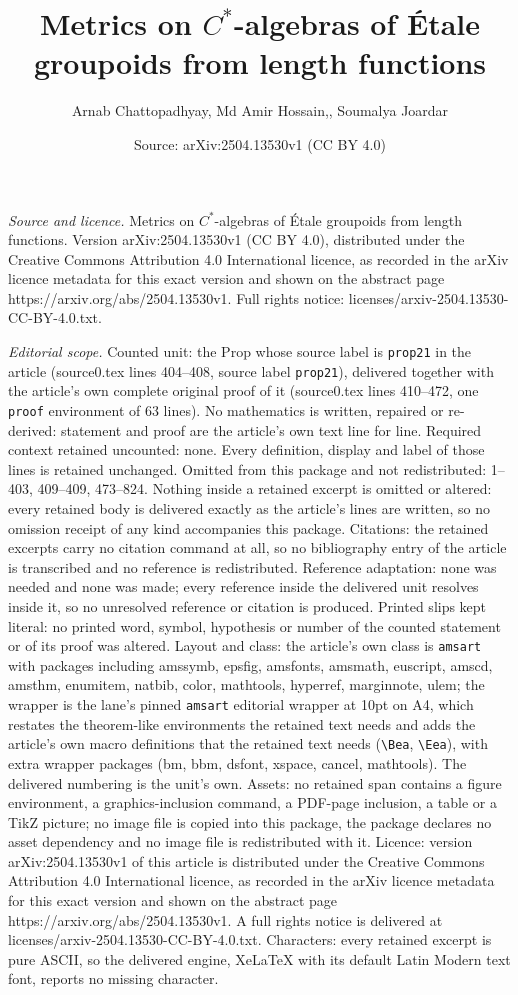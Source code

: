 \documentclass[10pt,a4paper]{amsart}
\title[Metrics on $C^{\ast}$-algebras of \'Etale groupoids from len]{Metrics on $C^{\ast}$-algebras of \'Etale groupoids from length functions}
\author{Arnab Chattopadhyay, Md Amir Hossain,, Soumalya Joardar}
\date{Source: arXiv:2504.13530v1 (CC BY 4.0)}
\begin{document}
\maketitle

\noindent\emph{Source and licence.} Metrics on $C^{\ast}$-algebras of \'Etale groupoids from length functions. Version arXiv:2504.13530v1 (CC BY 4.0), distributed under the Creative Commons Attribution 4.0 International licence, as recorded in the arXiv licence metadata for this exact version and shown on the abstract page https://arxiv.org/abs/2504.13530v1. Full rights notice: licenses/arxiv-2504.13530-CC-BY-4.0.txt.\par\smallskip

\noindent\textit{Editorial scope.} Counted unit: the Prop whose source label is \texttt{prop21} in the article (source0.tex lines 404--408, source label \texttt{prop21}), delivered together with the article's own complete original proof of it (source0.tex lines 410--472, one \texttt{proof} environment of 63 lines). No mathematics is written, repaired or re-derived: statement and proof are the article's own text line for line. Required context retained uncounted: none. Every definition, display and label of those lines is retained unchanged. Omitted from this package and not redistributed: 1--403, 409--409, 473--824. Nothing inside a retained excerpt is omitted or altered: every retained body is delivered exactly as the article's lines are written, so no omission receipt of any kind accompanies this package. Citations: the retained excerpts carry no citation command at all, so no bibliography entry of the article is transcribed and no reference is redistributed. Reference adaptation: none was needed and none was made; every reference inside the delivered unit resolves inside it, so no unresolved reference or citation is produced. Printed slips kept literal: no printed word, symbol, hypothesis or number of the counted statement or of its proof was altered. Layout and class: the article's own class is \texttt{amsart} with packages including amssymb, epsfig, amsfonts, amsmath, euscript, amscd, amsthm, enumitem, natbib, color, mathtools, hyperref, marginnote, ulem; the wrapper is the lane's pinned \texttt{amsart} editorial wrapper at 10pt on A4, which restates the theorem-like environments the retained text needs and adds the article's own macro definitions that the retained text needs (\texttt{\textbackslash Bea}, \texttt{\textbackslash Eea}), with extra wrapper packages (bm, bbm, dsfont, xspace, cancel, mathtools). The delivered numbering is the unit's own. Assets: no retained span contains a figure environment, a graphics-inclusion command, a PDF-page inclusion, a table or a TikZ picture; no image file is copied into this package, the package declares no asset dependency and no image file is redistributed with it. Licence: version arXiv:2504.13530v1 of this article is distributed under the Creative Commons Attribution 4.0 International licence, as recorded in the arXiv licence metadata for this exact version and shown on the abstract page https://arxiv.org/abs/2504.13530v1. A full rights notice is delivered at licenses/arxiv-2504.13530-CC-BY-4.0.txt. Characters: every retained excerpt is pure ASCII, so the delivered engine, XeLaTeX with its default Latin Modern text font, reports no missing character.
\end{document}
